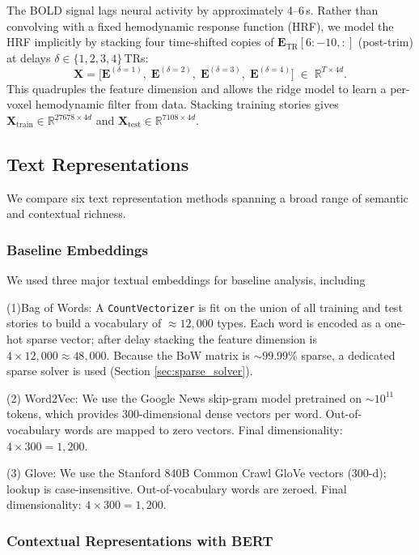 The BOLD signal lags neural activity by approximately 4--6\,s.  Rather than
convolving with a fixed hemodynamic response function (HRF), we model the HRF
implicitly by stacking four time-shifted copies of
$\bm{E}_{\mathrm{TR}}[6{:}-10, :]$ (post-trim) at delays
$\delta \in \{1, 2, 3, 4\}$\,TRs:
%
\begin{equation}
  \bm{X} = \bigl[\bm{E}^{(\delta=1)},\; \bm{E}^{(\delta=2)},\;
                  \bm{E}^{(\delta=3)},\; \bm{E}^{(\delta=4)}\bigr]
  \;\in\; \mathbb{R}^{T \times 4d}.
\end{equation}
%
This quadruples the feature dimension and allows the ridge model to learn a
per-voxel hemodynamic filter from data.  Stacking training stories gives
$\bm{X}_{\mathrm{train}} \in \mathbb{R}^{27678 \times 4d}$ and
$\bm{X}_{\mathrm{test}} \in \mathbb{R}^{7108 \times 4d}$.


\subsection{Text Representations}


We compare six text representation methods spanning a broad range of semantic
and contextual richness.
\subsubsection{Baseline Embeddings}
We used three major textual embeddings for baseline analysis, including 

(1)Bag of Words: A \texttt{CountVectorizer} is fit on the union of all training and test stories
to build a vocabulary of ${\approx}12{,}000$ types.  Each word is encoded as a
one-hot sparse vector; after delay stacking the feature dimension is
$4 \times 12{,}000 \approx 48{,}000$.  Because the BoW matrix is
${\sim}99.99\%$ sparse, a dedicated sparse solver is used (Section
\ref{sec:sparse_solver}).



(2) Word2Vec: We use the Google News skip-gram model pretrained on ${\sim}10^{11}$ tokens,
which provides 300-dimensional dense vectors per word.  Out-of-vocabulary words
are mapped to zero vectors.  Final dimensionality: $4 \times 300 = 1{,}200$.



(3) Glove: We use the Stanford 840B Common Crawl GloVe vectors (300-d); lookup is
case-insensitive.  Out-of-vocabulary words are zeroed.  Final dimensionality:
$4 \times 300 = 1{,}200$.

\subsubsection{Contextual Representations with BERT}


